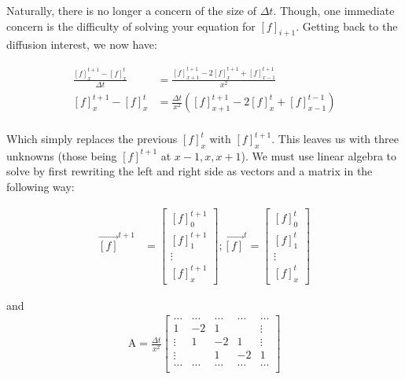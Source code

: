 \documentclass[12pt]{report}
\newcommand{\pr}[1]{\left(#1\right)}
\begin{document}
Naturally, there is no longer a concern of the size of $\Delta t$. Though, one immediate concern is the difficulty of solving your equation for $[f]_{i+1}$. Getting back to the diffusion interest, we now have:

\begin{equation} \label{eq8}
\begin{split}
\frac{[f]^{t+1}_{x} - [f]^{t}_{x}}{\Delta t} &= \frac{[f]^{t+1}_{x+1} - 2[f]^{t+1}_x + [f]^{t+1}_{x - 1}}{x^2}\\
[f]^{t+1}_{x} - [f]^{t}_{x} &= \frac{\Delta t}{x^2} \pr{[f]^{t+1}_{x+1} - 2[f]^{t}_x + [f]^{t-1}_{x - 1}} \\
\end{split}
\end{equation}


Which simply replaces the previous $[f]^{t}_{x}$ with $[f]^{t+1}_{x}$. This leaves us with three unknowns (those being $[f]^{t+1}$ at $x-1,x,x+1$). We must use linear algebra to solve by first rewriting the left and right side as vectors and a matrix in the following way: 

\begin{align}
\vec{[f]}^{t+1} &= \begin{bmatrix}
        [f]^{t+1}_{0} \\
        [f]^{t+1}_{1} \\
        \vdots \\
        [f]^{t+1}_{x}
\end{bmatrix}
; \vec{[f]}^{t} = \begin{bmatrix}
        [f]^{t}_{0} \\
        [f]^{t}_{1} \\
        \vdots \\
        [f]^{t}_{x}
\end{bmatrix}
\end{align}

and 
\begin{align}
\mathrm{A} = \frac{\Delta t}{x^2}
\begin{bmatrix} %
\dots       &   \dots       & \dots     &   \dots    &   \dots   \\
1           &   -2          & 1         &            &   \vdots    \\
\vdots      &   1           & -2        &   1        &   \vdots   \\   
\vdots      &               & 1         &   -2       &   1    \\
\dots       &   \dots       & \dots     &   \dots    &   \dots    \\
\end{bmatrix}
\end{align}
\end{document}
